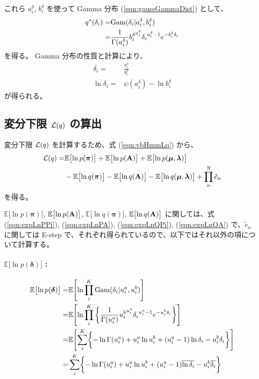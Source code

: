 これら $a_i^\delta$, $b_i^\delta$ を使って Gamma 分布 (\ref{eqn:gaussGammaDist}) として、
\begin{align}
  q^*( \delta_i )  =&  {\rm Gam}(\delta_i | a_i^\delta, b_i^\delta) \\
  =&  \frac{ 1 }{ \Gamma(a_i^\delta) } {b_i^\delta}^{a_i^\delta} {\delta_i}^{a_i^\delta - 1} e^{-b_i^\delta \delta_i}
\end{align}
を得る。
Gamma 分布の性質と計算により、
\begin{align}
  \overline{\delta_i}  =&  \frac{a_i^\delta}{b_i^\delta}  \\
  \overline{\ln \delta_i}  =&  \psi(a_i^\delta) - \ln b_i^\delta  
\end{align}
が得られる。


\subsection{ 変分下限 ${\cal L}(q)$ の算出 }

変分下限 ${\cal L}(q)$ を計算するため、式 (\ref{eqn:vbHmmLq}) から、
\begin{align}
  {\cal L}(q)  = &  \mathbb{E}\bigl[\ln p({\boldsymbol \pi}) \bigr] + \mathbb{E}\bigl[\ln p({\bf A}) \bigr] + \mathbb{E}\bigl[\ln p({\boldsymbol \mu}, {\boldsymbol \lambda}) \bigr]   \notag  \\
  &  - \mathbb{E}\bigl[\ln q({\boldsymbol \pi}) \bigr] - \mathbb{E}\bigl[\ln q({\bf A}) \bigr] - \mathbb{E}\bigl[\ln q({\boldsymbol \mu}, {\boldsymbol \lambda}) \bigr] + \prod_n^N \tilde{c}_n  
\end{align}
を得る。

$\mathbb{E}\bigl[\ln p({\boldsymbol \pi})\bigr]$, $\mathbb{E}\bigl[\ln p({\bf A})\bigr]$, $\mathbb{E}\bigl[\ln q({\boldsymbol \pi})\bigr]$, $\mathbb{E}\bigl[\ln q({\bf A}) \bigr]$ に関しては、式 (\ref{eqn:expLnPPi}), (\ref{eqn:expLnPA}), (\ref{eqn:expLnQPi}), (\ref{eqn:expLnQA}) で、$\tilde{c}_n$ に関しては E-step で、それぞれ得られているので、以下ではそれ以外の項について計算する。

\paragraph{$\mathbb{E}\bigl[\ln p({\boldsymbol \delta}) \bigr]$ : }
\begin{align}
  \mathbb{E}\bigl[\ln p({\boldsymbol \delta}) \bigr]  
    =&  \mathbb{E}\Biggl[ \ln \prod_i^K  {\rm Gam}(\delta_i | u_i^a, u_i^b)  \Biggr]  \\
%
    =&  \mathbb{E}\Biggl[ \ln \prod_i^K \left\{  
        \frac{1}{\Gamma(u_i^a)} {u_i^b}^{u_i^a} {\delta_i}^{u_i^a - 1} e^{- u_i^b \delta_i} 
      \right\}  \Biggr]  \\
%
    =&  \mathbb{E}\Biggl[ \sum_i^K \biggl\{  
        - \ln \Gamma(u_i^a) + u_i^a \ln u_i^b + \left(u_i^a - 1\right) \ln \delta_i - u_i^b \delta_i  
      \biggr\} \Biggr]  \\
%
    =&  \sum_i^K \biggl\{  
          - \ln \Gamma(u_i^a) + u_i^a \ln u_i^b + (u_i^a - 1) \overline{\ln \delta_i} - u_i^b \overline{\delta_i}  
      \biggr\}  
\end{align}

